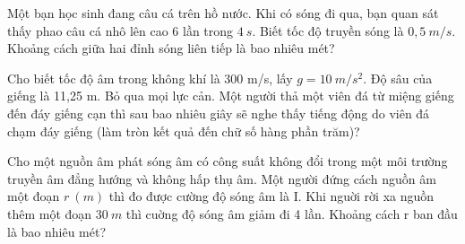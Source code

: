\begin{ex}
 Một bạn học sinh đang câu cá trên hồ nước. Khi có sóng đi qua, bạn quan sát thấy phao câu cá nhô lên cao 6 lần trong $4 ~s$. Biết tốc độ truyền sóng là $0,5 ~m/s$. Khoảng cách giữa hai đỉnh sóng liên tiếp là bao nhiêu mét?
\end{ex} 
\begin{ex}%
Cho biết tốc độ âm trong không khí là 300 m/s, lấy $g = 10\ m/s^2$. Độ sâu của giếng là 11,25 m. Bỏ qua mọi lực cản. Một người thả một viên đá từ miệng giếng đến đáy giếng cạn thì sau bao nhiêu giây sẽ nghe thấy tiếng động do viên đá chạm đáy giếng (làm tròn kết quả đến chữ số hàng phần trăm)? 
\end{ex} 
\begin{ex}
Cho một nguồn âm phát sóng âm có công suất không đổi trong một môi trường truyền âm đẳng hướng và không hấp thụ âm. Một người đứng cách nguồn âm một đoạn $r\ (m)$ thì đo được cường độ sóng âm là I. Khi nguời rời xa nguồn thêm một đoạn $30 ~m$ thì cuờng độ sóng âm giảm đi 4 lần. Khoảng cách r ban đầu là bao nhiêu mét?
\\
\end{ex} 


